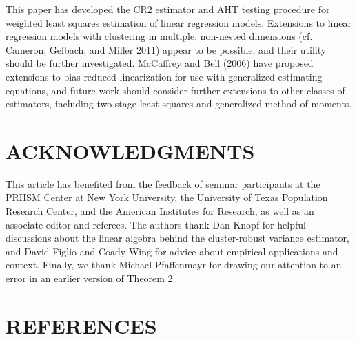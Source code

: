 \documentclass[12pt]{article}
\begin{document}
This paper has developed the CR2 estimator and AHT testing procedure for
weighted least squares estimation of linear regression models.
Extensions to linear regression models with clustering in multiple,
non-nested dimensions (cf. Cameron, Gelbach, and Miller 2011) appear to
be possible, and their utility should be further investigated. McCaffrey
and Bell (2006) have proposed extensions to bias-reduced linearization
for use with generalized estimating equations, and future work should
consider further extensions to other classes of estimators, including
two-stage least squares and generalized method of moments.

\hypertarget{acknowledgments}{%
\section*{ACKNOWLEDGMENTS}\label{acknowledgments}}

This article has benefited from the feedback of seminar participants at
the PRIISM Center at New York University, the University of Texas
Population Research Center, and the American Institutes for Research, as
well as an associate editor and referees. The authors thank Dan Knopf
for helpful discussions about the linear algebra behind the
cluster-robust variance estimator, and David Figlio and Coady Wing for
advice about empirical applications and context. Finally, we thank
Michael Pfaffenmayr for drawing our attention to an error in an earlier
version of Theorem 2.

\hypertarget{references}{%
\section*{REFERENCES}\label{references}}
\end{document}
